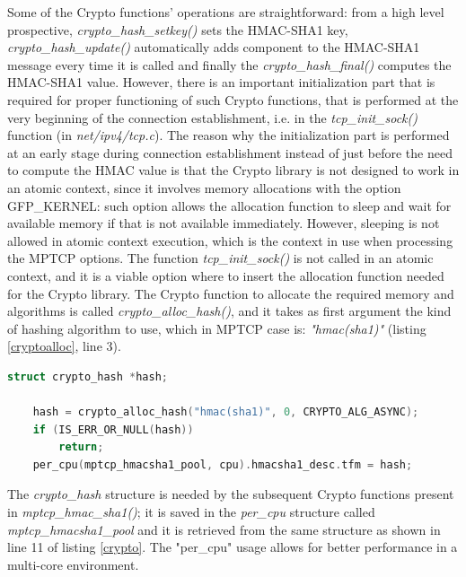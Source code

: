 Some of the Crypto functions' operations are straightforward: from a high level prospective, \textit{crypto\_hash\_setkey()} sets the HMAC-SHA1 key, \textit{crypto\_hash\_update()} automatically adds component to the HMAC-SHA1 message every time it is called and finally the \textit{crypto\_hash\_final()} computes the HMAC-SHA1 value.
However, there is an important initialization part that is required for proper functioning of such Crypto functions, that is performed at the very beginning of the connection establishment, i.e. in the \textit{tcp\_init\_sock()} function (in \textit{net/ipv4/tcp.c}). The reason why the initialization part is performed at an early stage during connection establishment instead of just before the need to compute the HMAC value is that the Crypto library is not designed to work in an atomic context, since it involves memory allocations with the option GFP\_KERNEL: such option allows the allocation function to sleep and wait for available memory if that is not available immediately. However, sleeping is not allowed in atomic context execution, which is the context in use when processing the MPTCP options. The function \textit{tcp\_init\_sock()} is not called in an atomic context, and it is a viable option where to insert the allocation function needed for the Crypto library. The Crypto function to allocate the required memory and algorithms is called \textit{crypto\_alloc\_hash()}, and it takes as first argument the kind of hashing algorithm to use, which in MPTCP case is: \textit{"hmac(sha1)"} (listing \ref{cryptoalloc}, line 3).

\begin{lstlisting}[language=c, caption=\textit{\textit{Initializing the Crypto-API framework}}, label=cryptoalloc]
	struct crypto_hash *hash;

	hash = crypto_alloc_hash("hmac(sha1)", 0, CRYPTO_ALG_ASYNC);
	if (IS_ERR_OR_NULL(hash))
		return;
	per_cpu(mptcp_hmacsha1_pool, cpu).hmacsha1_desc.tfm = hash;
\end{lstlisting}

The \textit{crypto\_hash} structure is needed by the subsequent Crypto functions present in \textit{mptcp\_hmac\_sha1()}; it is saved in the \textit{per\_cpu} structure called \textit{mptcp\_hmacsha1\_pool} and it is retrieved from the same structure as shown in line 11 of listing \ref{crypto}. The "per\_cpu" usage allows for better performance in a multi-core environment.

